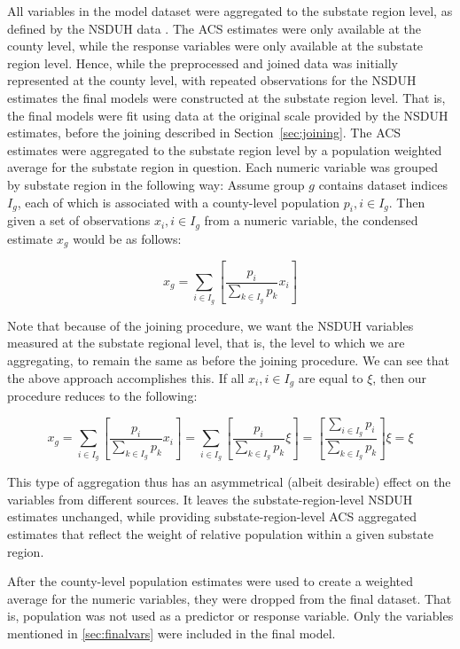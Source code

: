 \documentclass{article}
\begin{document}
All variables in the model dataset were aggregated to the substate region level,
as defined by the NSDUH data \cite{samhsa_substate_region_defs}.
The ACS estimates were only available at the county level,
while the response variables were only available at the substate region level.
Hence, while the preprocessed and joined data was
initially represented at the county level,
with repeated observations for the NSDUH estimates
the final models were constructed at the substate region level.
That is, the final models were fit using data at the original
scale provided by the NSDUH estimates, before the joining described in
Section~\ref{sec:joining}.
The ACS estimates were aggregated to the substate region level
by a population weighted average for the substate region in question.
Each numeric variable was grouped by substate region
in the following way:
Assume group $g$ contains dataset indices $I_g$,
each of which is associated with a county-level population
$p_{i}, i \in I_g$.
Then given a set of observations $x_{i}, i \in I_g$
from a numeric variable,
the condensed estimate $x_g$ would be as follows:

\begin{equation*}
    x_g = \sum_{i \in I_g}
    \left[ \frac{p_{i}}{\sum_{k \in I_g} p_{k}} x_i \right]
\end{equation*}

Note that because of the joining procedure,
we want the NSDUH variables measured at the substate regional level,
that is, the level to which we are aggregating,
to remain the same as before the joining procedure.
We can see that the above approach accomplishes this.
If all $x_i, i \in I_g$ are equal to $\xi$,
then our procedure reduces to the following:

\begin{equation*}
    x_g =
    \sum_{i \in I_g}
    \left[ \frac{p_{i}}{\sum_{k \in I_g} p_{k}} x_i \right] =
    \sum_{i \in I_g}
    \left[ \frac{p_{i}}{\sum_{k \in I_g} p_{k}} \xi \right] =
    \left[ \frac{\sum_{i \in I_g}p_{i}}{\sum_{k \in I_g} p_{k}} \right] \xi =
    \xi
\end{equation*}

This type of aggregation thus has an asymmetrical (albeit desirable)
effect on the variables from different sources.
It leaves the substate-region-level NSDUH estimates unchanged,
while providing substate-region-level ACS aggregated estimates
that reflect the weight of relative population within a given substate region.

After the county-level population estimates were used
to create a weighted average for the numeric variables,
they were dropped from the final dataset.
That is, population was not used as a predictor or response variable.
Only the variables mentioned in \ref{sec:finalvars}
were included in the final model.
\end{document}
